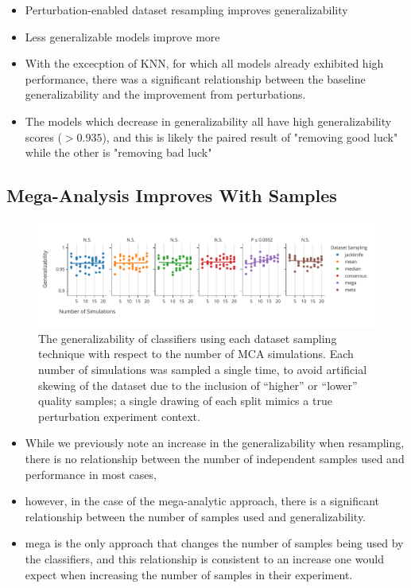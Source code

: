 \documentclass[10pt]{SelfArx} %
\begin{document}
\begin{itemize}
\item Perturbation-enabled dataset resampling improves generalizability
\item Less generalizable models improve more
\item With the excecption of KNN, for which all models already exhibited high performance, there was a significant
relationship between the baseline generalizability and the improvement from perturbations.
\item The models which decrease in generalizability all have high generalizability scores ($>0.935$), and this is
likely the paired result of "removing good luck" while the other is "removing bad luck"
\end{itemize}


\subsection*{Mega-Analysis Improves With Samples}

\begin{figure}[ht]\centering
\includegraphics[width=\linewidth]{figures/3.pdf}
\caption{The generalizability of classifiers using each dataset sampling technique with respect to the number of MCA
simulations. Each number of simulations was sampled a single time, to avoid artificial skewing of the dataset due to
the inclusion of ``higher'' or ``lower'' quality samples; a single drawing of each split mimics a true perturbation
experiment context.}
\label{fig:nsamples}
\end{figure}

\begin{itemize}
\item While we previously note an increase in the generalizability when resampling, there is no relationship between
the number of independent samples used and performance in most cases,
\item however, in the case of the mega-analytic approach, there is a significant relationship between the number of
samples used and generalizability.
\item mega is the only approach that changes the number of samples being used by the classifiers, and this relationship
is consistent to an increase one would expect when increasing the number of samples in their experiment.
\end{itemize}
\end{document}
